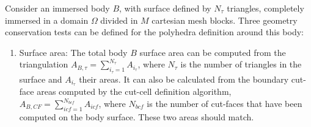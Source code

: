 \documentclass[12pt]{article}
\begin{document}
Consider an immersed body $B$, with surface defined by $N_\tau$ triangles, completely immersed in a domain $\Omega$ divided in $M$ cartesian mesh blocks. 
Three geometry conservation tests can be defined for the polyhedra definition around this body:
%
\begin{enumerate}
    
    \item Surface area: 
    The total body $B$ surface area can be computed from the triangulation $A_{B,\tau}=\sum_{i_\tau=1}^{N_\tau}{A_{i_\tau}}$, where $N_\tau$ is the number of triangles in the surface and $A_{i_\tau}$ their areas. It can also be calculated from the boundary cut-face areas computed by the cut-cell definition algorithm,  $A_{B,CF}=\sum_{icf=1}^{N_{bcf}}{A_{icf}}$, where $N_{bcf}$ is the number of cut-faces that have been computed on the body surface. These two areas should match.
    \newline
    

\end{enumerate}
\end{document}
